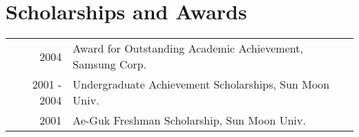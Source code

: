 \documentclass[a4paper,10pt]{article} %
\begin{document}

\section{Scholarships and Awards}

\begin{tabular}{rl}
	2004 & Award for Outstanding Academic Achievement, Samsung Corp.\\
	2001 - 2004 & Undergraduate Achievement Scholarships, Sun Moon
	Univ.\\
	2001 & Ae-Guk Freshman Scholarship, Sun Moon Univ.\\
\end{tabular}


%
%


\renewcommand\refname{Publications} %

\nocite{*} %

\end{document}
